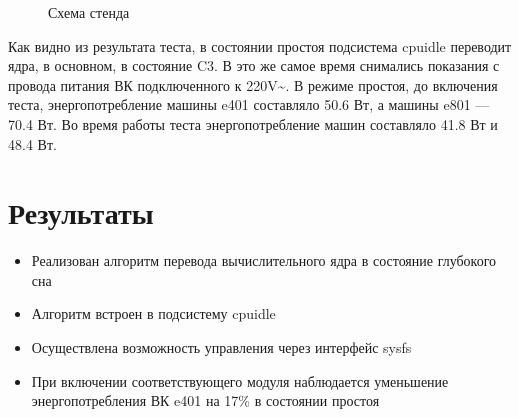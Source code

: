 \documentclass{article}
\begin{document}
\begin{figure}[h]
\caption{Схема стенда}
\end{figure}

Как видно из результата теста, в состоянии простоя подсистема cpuidle переводит ядра, в основном, в состояние C3. В это же самое время снимались показания с провода питания ВК подключенного к 220V\textasciitilde. В режиме простоя, до включения теста, энергопотребление машины e401 составляло 50.6 Вт, а машины e801 --- 70.4 Вт. Во время работы теста энергопотребление машин составляло 41.8 Вт и 48.4 Вт.

\newpage
\section{Результаты}

\begin{itemize}
\item Реализован алгоритм перевода вычислительного ядра в состояние глубокого сна
\item Алгоритм встроен в подсистему cpuidle
\item Осуществлена возможность управления через интерфейс sysfs
\item При включении соответствующего модуля наблюдается уменьшение энергопотребления ВК e401 на 17\% в состоянии простоя 
\end{itemize}


\newpage

\end{document}
